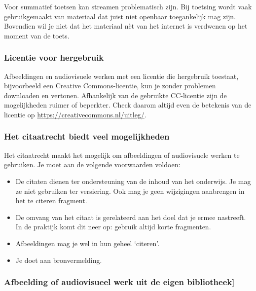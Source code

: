 \documentclass[
]{book}
\providecommand{\tightlist}{%
  \setlength{\itemsep}{0pt}\setlength{\parskip}{0pt}}
\begin{document}
Voor summatief toetsen kan streamen problematisch zijn. Bij toetsing wordt vaak gebruikgemaakt van materiaal dat juist niet openbaar toegankelijk mag zijn. Bovendien wil je niet dat het materiaal nèt van het internet is verdwenen op het moment van de toets.

\hypertarget{licentie-voor-hergebruik}{%
\subsubsection{Licentie voor hergebruik}\label{licentie-voor-hergebruik}}

Afbeeldingen en audiovisuele werken met een licentie die hergebruik toestaat, bijvoorbeeld een Creative Commons-licentie, kun je zonder problemen downloaden en vertonen. Afhankelijk van de gebruikte CC-licentie zijn de mogelijkheden ruimer of beperkter. Check daarom altijd even de betekenis van de licentie op \url{https://creativecommons.nl/uitleg/}.

\hypertarget{het-citaatrecht-biedt-veel-mogelijkheden}{%
\subsubsection{Het citaatrecht biedt veel mogelijkheden}\label{het-citaatrecht-biedt-veel-mogelijkheden}}

Het citaatrecht maakt het mogelijk om afbeeldingen of audiovisuele werken te gebruiken. Je moet aan de volgende voorwaarden voldoen:

\begin{itemize}
\tightlist
\item
  De citaten dienen ter ondersteuning van de inhoud van het onderwijs. Je mag ze niet gebruiken ter versiering. Ook mag je geen wijzigingen aanbrengen in het te citeren fragment.
\item
  De omvang van het citaat is gerelateerd aan het doel dat je ermee nastreeft. In de praktijk komt dit neer op: gebruik altijd korte fragmenten.
\item
  Afbeeldingen mag je wel in hun geheel `citeren'.
\item
  Je doet aan bronvermelding.
\end{itemize}

\hypertarget{afbeelding-of-audiovisueel-werk-uit-de-eigen-bibliotheek}{%
\subsubsection{Afbeelding of audiovisueel werk uit de eigen bibliotheek{]}}\label{afbeelding-of-audiovisueel-werk-uit-de-eigen-bibliotheek}}
\end{document}
